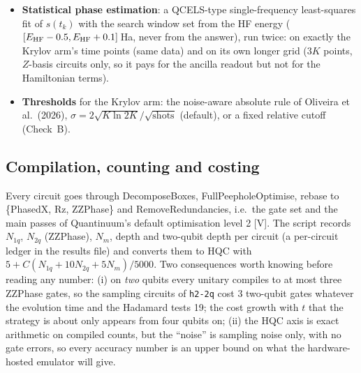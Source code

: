 \documentclass[11pt,a4paper]{article}
\newcommand{\lV}{\textcolor{keyblue}{[V]}}   %
\begin{document}
\begin{itemize}
\item \textbf{Statistical phase estimation}: a QCELS-type single-frequency least-squares fit of $s(t_k)$ with the search window set from the HF energy ($[E_{\rm HF}-0.5, E_{\rm HF}+0.1]$\,Ha, never from the answer), run twice: on exactly the Krylov arm's time points (same data) and on its own longer grid ($3K$ points, $Z$-basis circuits only, so it pays for the ancilla readout but not for the Hamiltonian terms).
\item \textbf{Thresholds} for the Krylov arm: the noise-aware absolute rule of Oliveira et al.\ (2026), $\sigma=2\sqrt{K\ln 2K}/\sqrt{\text{shots}}$ (default), or a fixed relative cutoff (Check~B).
\end{itemize}

\subsection{Compilation, counting and costing}
Every circuit goes through DecomposeBoxes, FullPeepholeOptimise, rebase to \{PhasedX, Rz, ZZPhase\} and RemoveRedundancies, i.e.\ the gate set and the main passes of Quantinuum's default optimisation level 2 \lV. The script records $N_{1q}$, $N_{2q}$ (ZZPhase), $N_m$, depth and two-qubit depth per circuit (a per-circuit ledger in the results file) and converts them to HQC with $5+C(N_{1q}+10N_{2q}+5N_m)/5000$. Two consequences worth knowing before reading any number: (i) on \emph{two} qubits every unitary compiles to at most three ZZPhase gates, so the sampling circuits of \texttt{h2-2q} cost 3 two-qubit gates whatever the evolution time and the Hadamard tests 19; the cost growth with $t$ that the strategy is about only appears from four qubits on; (ii) the HQC axis is exact arithmetic on compiled counts, but the ``noise'' is sampling noise only, with no gate errors, so every accuracy number is an upper bound on what the hardware-hosted emulator will give.
\end{document}
